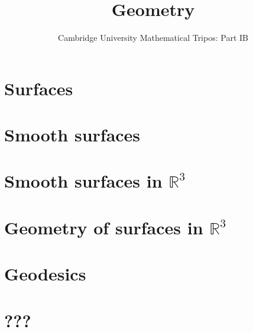 \documentclass{article}
\title{Geometry}
\author{Cambridge University Mathematical Tripos: Part IB}
\begin{document}
\maketitle

\tableofcontentsnewpage{}

\section{Surfaces}

\section{Smooth surfaces}

\section{Smooth surfaces in \( \mathbb R^3 \)}

\section{Geometry of surfaces in \( \mathbb R^3 \)}

\section{Geodesics}

\section{???}

\end{document}
